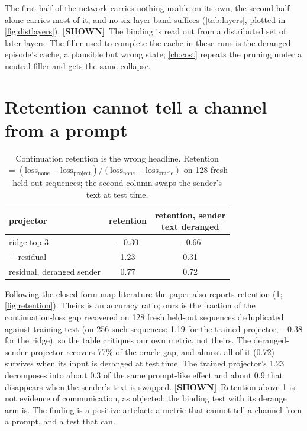 \documentclass[11pt,a4paper]{report}
\newcommand{\SHOWN}{\textcolor{shownc}{\textbf{\scriptsize[SHOWN]}}}
\begin{document}
The first half of the network carries nothing usable on its own, the second half alone carries most of it, and no six-layer band suffices (\cref{tab:layers}, plotted in \cref{fig:distlayers}). \SHOWN\ The binding is read out from a distributed set of later layers. The filler used to complete the cache in these runs is the deranged episode's cache, a plausible but wrong state; \cref{ch:cost} repeats the pruning under a neutral filler and gets the same collapse.

\section{Retention cannot tell a channel from a prompt}

\begin{table}[h]
\caption{Continuation retention is the wrong headline. Retention $= (\mathrm{loss}_{\text{none}} - \mathrm{loss}_{\text{project}}) / (\mathrm{loss}_{\text{none}} - \mathrm{loss}_{\text{oracle}})$ on 128 fresh held-out sequences; the second column swaps the sender's text at test time.}
\label{tab:retention}
\vskip 0.1in
\begin{center}
\begin{small}
\begin{tabular}{lcc}
\toprule
projector & retention & \shortstack{retention, sender\\text deranged} \\
\midrule
ridge top-3                          & $-0.30$ & $-0.66$ \\
$+$ residual                         & 1.23    & 0.31 \\
residual, deranged sender & 0.77    & 0.72 \\
\bottomrule
\end{tabular}
\end{small}
\end{center}
\vskip -0.1in
\end{table}

Following the closed-form-map literature \citep{2608.03893} the paper also reports retention (\cref{tab:retention}; \cref{fig:retention}). Theirs is an accuracy ratio; ours is the fraction of the continuation-loss gap recovered on 128 fresh held-out sequences deduplicated against training text (on 256 such sequences: 1.19 for the trained projector, $-0.38$ for the ridge), so the table critiques our own metric, not theirs. The deranged-sender projector recovers 77\% of the oracle gap, and almost all of it (0.72) survives when its input is deranged at test time. The trained projector's 1.23 decomposes into about 0.3 of the same prompt-like effect and about 0.9 that disappears when the sender's text is swapped. \SHOWN\ Retention above 1 is not evidence of communication, as \citet{2608.04893} objected; the binding test with its derange arm is. The finding is a positive artefact: a metric that cannot tell a channel from a prompt, and a test that can.
\end{document}
